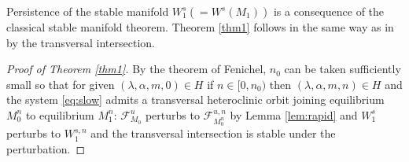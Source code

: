 \documentclass[usletter,11pt]{article}
\theoremstyle{remark}
\begin{document}
Persistence of the stable manifold $W_1^s (= W^s(M_1))$ is a consequence of the classical stable manifold theorem. Theorem \ref{thm1} follows in the same way as in \cite[Theorem 3.1]{Sz1991} by the transversal intersection.

\begin{proof}[Proof of Theorem \ref{thm1}] 
 By the theorem of Fenichel, $n_0$ can be taken sufficiently small so that for given $(\lambda,\alpha,m,0)\in H$ if $n \in [0, n_0)$ then $(\lambda,\alpha,m,n) \in H$ and  the system  \eqref{eq:slow} admits a transversal heteroclinic orbit joining equilibrium $M_0^{n}$ to equilibrium $M_1^{n}$: $\mathcal{F}^u_{M_0}$ perturbs to $\mathcal{F}^{u,n}_{M_0^n}$ by Lemma \ref{lem:rapid} and $W_1^s$ perturbs to $W_1^{s,n}$ and the transversal intersection is stable under the perturbation. 
\end{proof}
\end{document}
